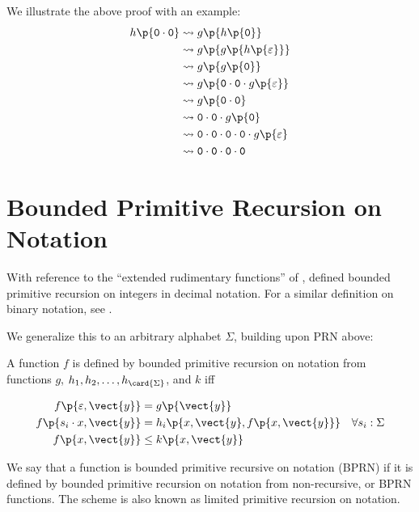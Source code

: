 \begin{example}
We illustrate the above proof with an example:
\begin{align}
h\p{\mathtt{0} \cdot \mathtt{0}}
  &\leadsto g\p{h\p{\mathtt{0}}} \\
  &\leadsto g\p{g\p{h\p{\varepsilon}}} \\
  &\leadsto g\p{g\p{\mathtt{0}}} \\
  &\leadsto g\p{\mathtt{0} \cdot \mathtt{0} \cdot g\p{\varepsilon}} \\
  &\leadsto g\p{\mathtt{0} \cdot \mathtt{0}} \\
  &\leadsto \mathtt{0} \cdot \mathtt{0} \cdot g\p{\mathtt{0}} \\
  &\leadsto \mathtt{0} \cdot \mathtt{0} \cdot \mathtt{0} \cdot \mathtt{0} \cdot g\p{\varepsilon} \\
  &\leadsto \mathtt{0} \cdot \mathtt{0} \cdot \mathtt{0} \cdot \mathtt{0}
\end{align}
\end{example}

\section{Bounded Primitive Recursion on Notation}

With reference to the ``extended rudimentary functions'' of
\cite{bennett-1962}, \cite{cobham-1965} defined bounded primitive recursion on
integers in decimal notation. For a similar definition on binary notation, see
\cite[p.  127]{rose-1984}.

We generalize this to an arbitrary alphabet $\Sigma$, building upon PRN above:

\begin{definition}

A function $f$ is defined by bounded primitive recursion on notation from
functions $g$, $h_1,h_2,\ldots,h_{\card{\Sigma}}$, and $k$ iff

\begin{align}
f\p{\varepsilon, \vect{y}}  &= g\p{\vect{y}} \\
f\p{s_i \cdot x,\vect{y}} &= h_i\p{x,\vect{y},f\p{x,\vect{y}}} & \forall s_i : \Sigma \\
f\p{x,\vect{y}} &\leq k\p{x,\vect{y}}\label{def-brn-poly-bound}
\end{align}

\end{definition}

We say that a function is bounded primitive recursive on notation (BPRN) if it
is defined by bounded primitive recursion on notation from non-recursive, or
BPRN functions. The scheme is also known as limited primitive recursion on
notation.

